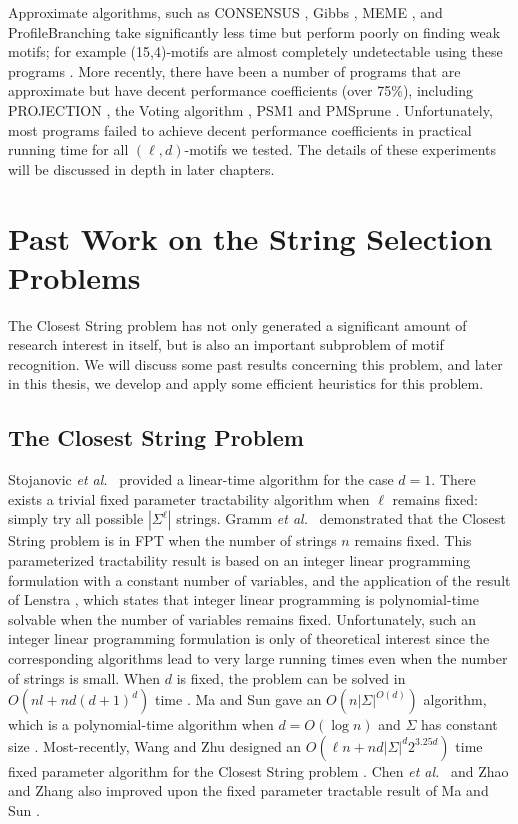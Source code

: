 Approximate algorithms, such as CONSENSUS \cite{HS}, Gibbs \cite{LABLNW}, MEME \cite{BE95}, and ProfileBranching \cite{PRP} take significantly less time but perform poorly on finding weak motifs; for example (15,4)-motifs are almost completely undetectable using these programs \cite{HHS90}. More recently, there have been a number of programs that are approximate but have decent performance coefficients (over 75\%), including PROJECTION \cite{BT02}, the Voting algorithm \cite{CL05}, PSM1 \cite{RBH05} and PMSprune \cite{JBR07}.  Unfortunately, most programs failed to achieve decent performance coefficients in practical running time for all $(\ell, d)$-motifs we tested.  The details of these experiments will be discussed in depth in later chapters. 

\section{Past Work on the String Selection Problems}

The {\sc Closest String} problem has not only generated a significant amount of research interest in itself, but is also an important subproblem of motif recognition. We will discuss some past results concerning this problem, and later in this thesis, we develop and apply some efficient heuristics for this problem.  

\subsection{The {\sc Closest String} Problem}

Stojanovic {\em et al.}\ \cite{sto} provided a linear-time algorithm for the case $d=1$. There exists a trivial fixed parameter tractability algorithm when $\ell$ remains fixed: simply try all possible $|\Sigma^{\ell}|$ strings.  Gramm {\em et al.}\ \cite{GNR03}  demonstrated that the {\sc Closest String} problem is in FPT when the number of strings $n$ remains fixed.  This parameterized tractability result is based on an integer linear programming formulation with a constant number of variables, and the application of the result of Lenstra \cite{Len}, which states that integer linear programming is polynomial-time solvable when the number of variables remains fixed. Unfortunately, such an integer linear programming formulation is only of theoretical interest since the corresponding algorithms lead to very large running times even when the number of strings is small. When $d$ is fixed, the problem can be solved in $O(nl + nd(d + 1)^d)$ time \cite{GNR03}.  Ma and Sun gave an $O(n |\Sigma|^{O(d)})$ algorithm, which is a polynomial-time algorithm when $d = O(\log n)$ and $\Sigma$ has constant size \cite{MS08}. Most-recently, Wang and Zhu designed an $O(\ell n + nd|\Sigma|^d 2^{3.25d} )$ time fixed parameter algorithm for the {\sc Closest String} problem \cite{WZ}. Chen {\em et al.}\ \cite{CMW} and Zhao and Zhang \cite{ZZ} also improved upon the fixed parameter tractable result of Ma and Sun \cite{MS08}. 

